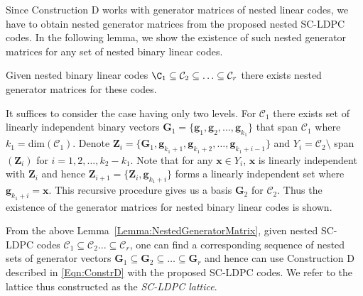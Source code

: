 \documentclass[journal]{IEEEtran}
\begin{document}
Since Construction D works with generator matrices of nested linear codes, we have to obtain nested generator matrices from the proposed nested SC-LDPC codes. In the following lemma, we show the existence of such nested generator matrices for any set of nested binary linear codes.
\begin{lemma}\label{Lemma:NestedGeneratorMatrix}
    Given nested binary linear codes $\C_{1}\subseteq \mathcal{C}_{2}\subseteq\ldots \subseteq\mathcal{C}_{r}$ there exists nested generator matrices for these codes.
\end{lemma}
\begin{IEEEproof}
It suffices to consider the case having only two levels. For $\mathcal{C}_{1}$ there exists set of linearly independent binary vectors
$\mathbf{G}_{1}=\{\mathbf{g}_1,\mathbf{g}_2,\ldots, \mathbf{g}_{k_1}\}$ that span $\mathcal{C}_{1}$ where $k_{1}=$dim$(\mathcal{C}_{1})$.
Denote $\mathbf{Z}_{i}=\{\mathbf{G}_{1},\mathbf{g}_{k_{1}+1},\mathbf{g}_{k_{1}+2}, \ldots, \mathbf{g}_{k_{1}+i-1}\}$ and $Y_{i}=\mathcal{C}_{2}\setminus$
span$(\mathbf{Z}_{i})$ for $i=1,2, \ldots, k_{2}-k_{1}$. Note that for any $\mathbf{x}\in Y_{i}$, $\mathbf{x}$ is linearly independent with $\mathbf{Z}_{i}$ and hence
$\mathbf{Z}_{i+1}=\{\mathbf{Z}_{i},\mathbf{g}_{k_{1}+i}\}$ forms a linearly independent set where $\mathbf{g}_{k_{1}+i}=\mathbf{x}$. This recursive procedure gives us a basis $\mathbf{G}_{2}$ for $\mathcal{C}_{2}$. Thus the existence of the generator matrices for nested binary linear codes is shown.
\end{IEEEproof}
From the above Lemma~\ref{Lemma:NestedGeneratorMatrix}, given nested SC-LDPC codes $\mathcal{C}_{1}\subseteq \mathcal{C}_{2}\ldots \subseteq\mathcal{C}_{r}$, one can find a corresponding sequence of nested sets of generator vectors $\mathbf{G}_{1}\subseteq \mathbf{G}_{2} \subseteq \ldots \subseteq\mathbf{G}_{r}$ and hence can use Construction D described in \eqref{Eqn:ConstrD} with the proposed SC-LDPC codes. We refer to the lattice thus constructed as the \textit{SC-LDPC lattice}.
\end{document}
